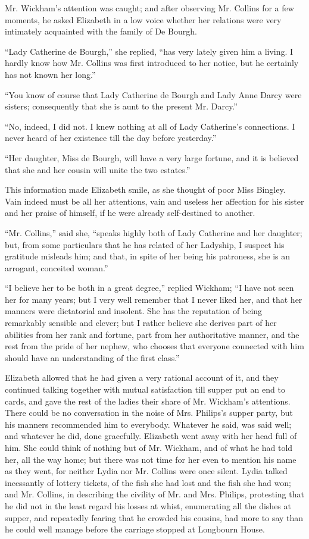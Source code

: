 \documentclass[12pt,openright]{book}
\begin{document}
Mr. Wickham’s attention was caught; and after observing Mr. Collins for a few moments, he asked Elizabeth in a low voice whether her relations were very intimately acquainted with the family of De Bourgh.

“Lady Catherine de Bourgh,” she replied, “has very lately given him a living. I hardly know how Mr. Collins was first introduced to her notice, but he certainly has not known her long.”

“You know of course that Lady Catherine de Bourgh and Lady Anne Darcy were sisters; consequently that she is aunt to the present Mr. Darcy.”

“No, indeed, I did not. I knew nothing at all of Lady Catherine’s connections. I never heard of her existence till the day before yesterday.”

“Her daughter, Miss de Bourgh, will have a very large fortune, and it is believed that she and her cousin will unite the two estates.”

This information made Elizabeth smile, as she thought of poor Miss Bingley. Vain indeed must be all her attentions, vain and useless her affection for his sister and her praise of himself, if he were already self-destined to another.

“Mr. Collins,” said she, “speaks highly both of Lady Catherine and her daughter; but, from some particulars that he has related of her Ladyship, I suspect his gratitude misleads him; and that, in spite of her being his patroness, she is an arrogant, conceited woman.”

“I believe her to be both in a great degree,” replied Wickham; “I have not seen her for many years; but I very well remember that I never liked her, and that her manners were dictatorial and insolent. She has the reputation of being remarkably sensible and clever; but I rather believe she derives part of her abilities from her rank and fortune, part from her authoritative manner, and the rest from the pride of her nephew, who chooses that everyone connected with him should have an understanding of the first class.”

Elizabeth allowed that he had given a very rational account of it, and they continued talking together with mutual satisfaction till supper put an end to cards, and gave the rest of the ladies their share of Mr. Wickham’s attentions. There could be no conversation in the noise of Mrs. Philips’s supper party, but his manners recommended him to everybody. Whatever he said, was said well; and whatever he did, done gracefully. Elizabeth went away with her head full of him. She could think of nothing but of Mr. Wickham, and of what he had told her, all the way home; but there was not time for her even to mention his name as they went, for neither Lydia nor Mr. Collins were once silent. Lydia talked incessantly of lottery tickets, of the fish she had lost and the fish she had won; and Mr. Collins, in describing the civility of Mr. and Mrs. Philips, protesting that he did not in the least regard his losses at whist, enumerating all the dishes at supper, and repeatedly fearing that he crowded his cousins, had more to say than he could well manage before the carriage stopped at Longbourn House.
\end{document}
